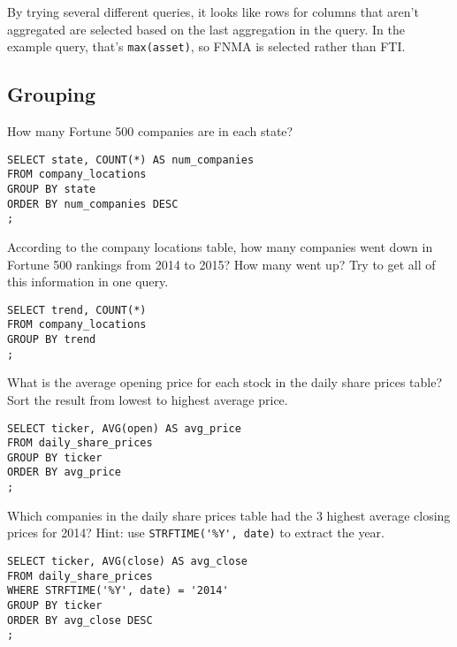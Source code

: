 \documentclass[10pt]{exam}
\begin{document}
\begin{questions}
\begin{solution}
By trying several different queries, it looks like rows for columns that aren't
aggregated are selected based on the last aggregation in the query. In the
example query, that's \lstinline{max(asset)}, so FNMA is selected rather than
FTI.
\end{solution}



\subsection*{Grouping}

\question How many Fortune 500 companies are in each state?

\begin{solution}
\begin{lstlisting}
SELECT state, COUNT(*) AS num_companies
FROM company_locations
GROUP BY state
ORDER BY num_companies DESC
;
\end{lstlisting}
\end{solution}


\question According to the company locations table, how many companies went
down in Fortune 500 rankings from 2014 to 2015? How many went up? Try to get
all of this information in one query.

\begin{solution}
\begin{lstlisting}
SELECT trend, COUNT(*)
FROM company_locations
GROUP BY trend
;
\end{lstlisting}
\end{solution}


\question What is the average opening price for each stock in the daily share
prices table? Sort the result from lowest to highest average price.

\begin{solution}
\begin{lstlisting}
SELECT ticker, AVG(open) AS avg_price
FROM daily_share_prices
GROUP BY ticker
ORDER BY avg_price
;
\end{lstlisting}
\end{solution}


\question Which companies in the daily share prices table had the 3 highest
average closing prices for 2014? Hint: use \lstinline{STRFTIME('%Y', date)} to
extract the year.

\begin{solution}
\begin{lstlisting}
SELECT ticker, AVG(close) AS avg_close
FROM daily_share_prices
WHERE STRFTIME('%Y', date) = '2014'
GROUP BY ticker
ORDER BY avg_close DESC
;
\end{lstlisting}
\end{solution}




\end{questions}
\end{document}
